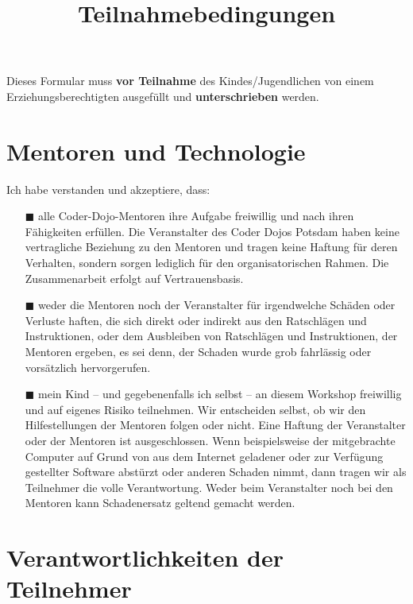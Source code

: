 \documentclass{coderdojopotsdam}
\title{Teilnahmebedingungen}
\begin{document}
\begin{Form}

	Dieses Formular muss \textbf{vor Teilnahme} des Kindes/Jugendlichen von einem Erziehungsberechtigten ausgefüllt und \textbf{unterschrieben} werden.





	\section*{Mentoren und Technologie}

	Ich habe verstanden und akzeptiere, dass:

	\begin{itemize}
		\item[$\blacksquare$] alle Coder-Dojo-Mentoren ihre Aufgabe freiwillig und nach ihren Fähigkeiten erfüllen.
			Die Veranstalter des Coder Dojos Potsdam haben keine vertragliche Beziehung zu den Mentoren und tragen keine Haftung für deren Verhalten, sondern sorgen lediglich für den organisatorischen Rahmen.
			Die Zusammenarbeit erfolgt auf Vertrauensbasis.
		\item[$\blacksquare$] weder die Mentoren noch der Veranstalter für irgendwelche Schäden oder Verluste haften, die sich direkt oder indirekt aus den Ratschlägen und Instruktionen, oder dem Ausbleiben von Ratschlägen und Instruktionen, der Mentoren ergeben, es sei denn, der Schaden wurde grob fahrlässig oder vorsätzlich hervorgerufen.
		\item[$\blacksquare$] mein Kind – und gegebenenfalls ich selbst – an diesem Workshop freiwillig und auf eigenes Risiko teilnehmen.
			Wir entscheiden selbst, ob wir den Hilfestellungen der Mentoren folgen oder nicht.
			Eine Haftung der Veranstalter oder der Mentoren ist ausgeschlossen.
			Wenn beispielsweise der mitgebrachte Computer auf Grund von aus dem Internet geladener oder zur Verfügung gestellter Software abstürzt oder anderen Schaden nimmt, dann tragen wir als Teilnehmer die volle Verantwortung.
			Weder beim Veranstalter noch bei den Mentoren kann Schadenersatz geltend gemacht werden.
	\end{itemize}

	\section*{Verantwortlichkeiten der Teilnehmer}


\end{Form}
\end{document}
